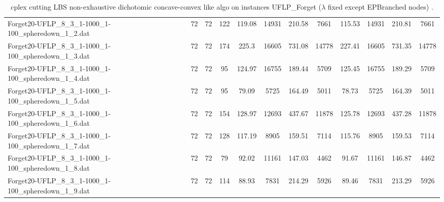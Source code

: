 \begin{sidewaystable}[!ht]
{\begin{tabular}{lccccccccccc}
Forget20-UFLP\_8\_3\_1-1000\_1-100\_spheredown\_1\_2.dat & 72 & 72 & 122 & 119.08 & 14931 & 210.58 & 7661 &  \textcolor{blue2}{115.53} & 14931 & 210.81 & 7661 \\
Forget20-UFLP\_8\_3\_1-1000\_1-100\_spheredown\_1\_3.dat & 72 & 72 & 174 &  \textcolor{blue2}{225.3} & 16605 & 731.08 & 14778 & 227.41 & 16605 & 731.35 & 14778 \\
Forget20-UFLP\_8\_3\_1-1000\_1-100\_spheredown\_1\_4.dat & 72 & 72 & 95 &  \textcolor{blue2}{124.97} & 16755 & 189.44 & 5709 & 125.45 & 16755 & 189.29 & 5709 \\
Forget20-UFLP\_8\_3\_1-1000\_1-100\_spheredown\_1\_5.dat & 72 & 72 & 95 & 79.09 & 5725 & 164.49 & 5011 & 78.73 & 5725 & 164.39 & 5011 \\
Forget20-UFLP\_8\_3\_1-1000\_1-100\_spheredown\_1\_6.dat & 72 & 72 & 154 & 128.97 & 12693 & 437.67 & 11878 &  \textcolor{blue2}{125.78} & 12693 & 437.28 & 11878 \\
Forget20-UFLP\_8\_3\_1-1000\_1-100\_spheredown\_1\_7.dat & 72 & 72 & 128 & 117.19 & 8905 & 159.51 & 7114 &  \textcolor{blue2}{115.76} & 8905 & 159.53 & 7114 \\
Forget20-UFLP\_8\_3\_1-1000\_1-100\_spheredown\_1\_8.dat & 72 & 72 & 79 & 92.02 & 11161 & 147.03 & 4462 & 91.67 & 11161 & 146.87 & 4462 \\
Forget20-UFLP\_8\_3\_1-1000\_1-100\_spheredown\_1\_9.dat & 72 & 72 & 114 & 88.93 & 7831 & 214.29 & 5926 & 89.46 & 7831 & 213.29 & 5926 \\
\bottomrule
\end{tabular}
}%
\caption{cplex cutting LBS non-exhaustive dichotomic concave-convex like algo on instances UFLP_Forget ($\lambda$ fixed except EPBranched nodes) .}
\end{sidewaystable}
